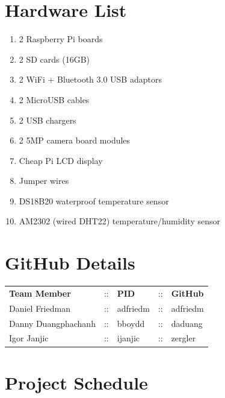 \section{Hardware List}
\begin{enumerate}

    \item 2 Raspberry Pi boards

    \item 2 SD cards (16GB)

    \item 2 WiFi + Bluetooth 3.0 USB adaptors

    \item 2 MicroUSB cables

    \item 2 USB chargers

    \item 2 5MP camera board modules

    \item Cheap Pi LCD display

    \item Jumper wires

    \item DS18B20 waterproof temperature sensor

    \item AM2302 (wired DHT22) temperature/humidity sensor

\end{enumerate}

\section{GitHub Details}
\begin{tabular}{ l c l c l}
    \textbf{Team Member} & :: & \textbf{PID} & :: & \textbf{GitHub} \\
    Daniel Friedman      & :: & adfriedm     & :: & adfriedm        \\
    Danny Duangphachanh  & :: & bboydd       & :: & daduang         \\
    Igor Janjic          & :: & ijanjic      & :: & zergler
\end{tabular}

\section{Project Schedule}

